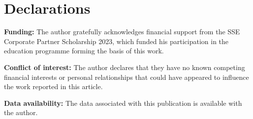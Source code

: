 \documentclass[pdflatex,sn-basic]{sn-jnl}%
\theoremstyle{thmstyleone}%
\theoremstyle{thmstyletwo}%
\theoremstyle{thmstylethree}%
\begin{document}
\section*{Declarations}

\noindent\textbf{Funding:} The author gratefully acknowledges financial support from the SSE Corporate Partner Scholarship 2023, which funded his participation in the education programme forming the basis of this work.

\noindent\textbf{Conflict of interest:} The author declares that they have no known competing financial interests or personal relationships that could have appeared to
influence the work reported in this article.

\noindent\textbf{Data availability:} The data associated with this publication is available with the author.






\end{document}
